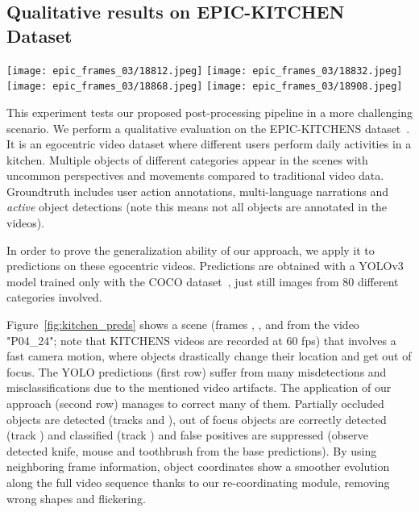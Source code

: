 \documentclass[letterpaper, 10 pt, conference]{ieeeconf}
\begin{document}
\subsection{Qualitative results on EPIC-KITCHEN Dataset}

\begin{figure*}[!htb]
    \centering
    \texttt{[image: epic\_frames\_03/18812.jpeg]}
    \texttt{[image: epic\_frames\_03/18832.jpeg]}
    \texttt{[image: epic\_frames\_03/18868.jpeg]}
    \texttt{[image: epic\_frames\_03/18908.jpeg]}
  
\caption{
    Object detection on EPIC-KITCHENS data using a YOLOv3 model (top row) and improvements obtained applying our post-processing (bottom row). Predicted bounding boxes are shown along with their track\_id when our post-processing is applied. To see more varied results these four frames are not consecutive (, ,  and ), watch the supplementary video for results on the whole  sequence\protect\footnotemark. 
    Low-scoring detections have been removed for a better visualization
    }
    \label{fig:kitchen_preds}
\end{figure*}

This experiment tests our proposed post-processing pipeline in a more challenging scenario. We perform a qualitative evaluation on the EPIC-KITCHENS dataset~\cite{damen2018scaling}. It is an egocentric video dataset where different users perform daily activities in a kitchen. 
Multiple objects of different categories appear in the scenes with uncommon perspectives and movements compared to traditional video data. Groundtruth includes user action annotations, multi-language narrations and \textit{active} object detections (note this means not all objects are annotated in the videos). 


In order to prove the generalization ability of our approach, we apply it to predictions on these egocentric videos. 
Predictions are obtained with a YOLOv3 model trained only with the COCO dataset~\cite{COCO:ECCV}, just still images from 80 different categories involved.



Figure~\ref{fig:kitchen_preds} shows a scene (frames , ,  and  from the video "P04\_24"; note that KITCHENS videos are recorded at 60 fps) that involves a fast camera motion, where objects drastically change their location and get out of focus. The YOLO predictions (first row) suffer from many misdetections and misclassifications due to the mentioned video artifacts. The application of our approach (second row) manages to correct many of them. Partially occluded objects are detected (tracks  and ), out of focus objects are correctly detected (track ) and classified (track ) and false positives are suppressed (observe detected knife, mouse and toothbrush from the base predictions). By using neighboring frame information, object coordinates show a smoother evolution along the full video sequence thanks to our re-coordinating module, removing wrong shapes and flickering.
\end{document}
